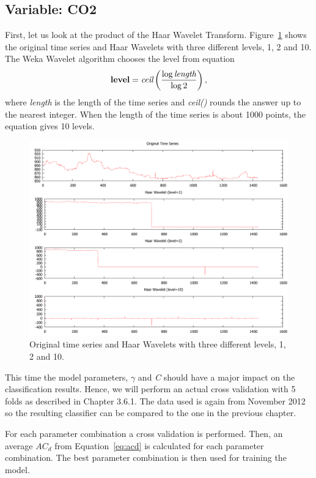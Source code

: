 \subsection*{Variable: CO2}
First, let us look at the product of the Haar Wavelet Transform. Figure~\ref{fig:wavelets} shows the original time series and Haar Wavelets with three different levels, 1, 2 and 10. The Weka Wavelet algorithm chooses the level from equation
\begin{align}
\mathbf{level} = \emph{ceil} \left ( \frac{\log{\emph{length}}}{\log{2}} \right ),
\end{align}
where \emph{length} is the length of the time series and \emph{ceil()} rounds the answer up to the nearest integer. When the length of the time series is about 1000 points, the equation gives 10 levels.


\begin{figure}[h!]
\includegraphics[scale=0.8]{images/wavelets.pdf}
\caption{Original time series and Haar Wavelets with three different levels, 1, 2 and 10.}
\label{fig:wavelets}
\end{figure}


This time the model parameters, $\gamma$ and \emph{C} should have a major impact on the classification results. Hence, we will perform an actual cross validation with 5 folds as described in Chapter 3.6.1. The data used is again from November 2012 so the resulting classifier can be compared to the one in the previous chapter.

For each parameter combination a cross validation is performed. Then, an average $AC_d$ from Equation~\ref{eq:acd} is calculated for each parameter combination. The best parameter combination is then used for training the model.


